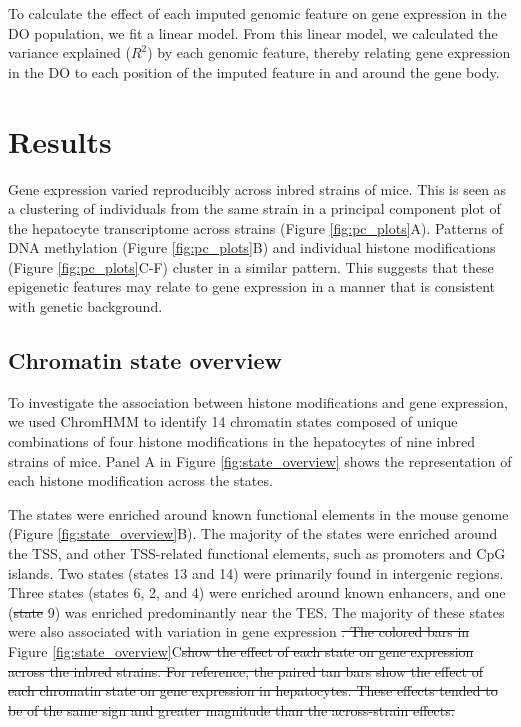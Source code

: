 \documentclass[10pt,letterpaper]{article}
\providecommand{\DIFaddtex}[1]{{\protect\color{blue}\uwave{#1}}} %
\providecommand{\DIFdeltex}[1]{{\protect\color{red}\sout{#1}}}                      %
\providecommand{\DIFaddbegin}{} %
\providecommand{\DIFaddend}{} %
\providecommand{\DIFdelbegin}{} %
\providecommand{\DIFdelend}{} %
\providecommand{\DIFadd}[1]{\texorpdfstring{\DIFaddtex{#1}}{#1}} %
\providecommand{\DIFdel}[1]{\texorpdfstring{\DIFdeltex{#1}}{}} %
\newcommand{\DIFscaledelfig}{0.5}
\newlength{\DIFdelgraphicswidth} %
\newlength{\DIFdelgraphicsheight} %
\newcommand{\DIFaddincludegraphics}[2][]{{\color{blue}\fbox{\DIFOincludegraphics[#1]{#2}}}} %
\newcommand{\DIFdelincludegraphics}[2][]{%
\sbox{\DIFdelgraphicsbox}{\DIFOincludegraphics[#1]{#2}}%
\settoboxwidth{\DIFdelgraphicswidth}{\DIFdelgraphicsbox} %
\settoboxtotalheight{\DIFdelgraphicsheight}{\DIFdelgraphicsbox} %
\scalebox{\DIFscaledelfig}{%
\parbox[b]{\DIFdelgraphicswidth}{\usebox{\DIFdelgraphicsbox}\\[-\baselineskip] \rule{\DIFdelgraphicswidth}{0em}}\llap{\resizebox{\DIFdelgraphicswidth}{\DIFdelgraphicsheight}{%
\setlength{\unitlength}{\DIFdelgraphicswidth}%
\begin{picture}(1,1)%
\thicklines\linethickness{2pt} %
{\color[rgb]{1,0,0}\put(0,0){\framebox(1,1){}}}%
{\color[rgb]{1,0,0}\put(0,0){\line( 1,1){1}}}%
{\color[rgb]{1,0,0}\put(0,1){\line(1,-1){1}}}%
\end{picture}%
}\hspace*{3pt}}} %
} %
\DeclareRobustCommand{\DIFaddbegin}{\DIFOaddbegin \let\includegraphics\DIFaddincludegraphics} %
\DeclareRobustCommand{\DIFaddend}{\DIFOaddend \let\includegraphics\DIFOincludegraphics} %
\DeclareRobustCommand{\DIFdelbegin}{\DIFOdelbegin \let\includegraphics\DIFdelincludegraphics} %
\DeclareRobustCommand{\DIFdelend}{\DIFOaddend \let\includegraphics\DIFOincludegraphics} %
\begin{document}
To calculate the effect of each imputed genomic feature on gene
expression in the DO population, we fit a linear model. From this linear
model, we calculated the variance explained (\(R^2\)) by each genomic
feature, thereby relating gene expression in the DO to each position of
the imputed feature in and around the gene body.

\hypertarget{results}{%
\section{Results}\label{results}}

Gene expression varied reproducibly across inbred strains of mice. This
is seen as a clustering of individuals from the same strain in a
principal component plot of the hepatocyte transcriptome across strains
(Figure \ref{fig:pc_plots}A). Patterns of DNA methylation (Figure
\ref{fig:pc_plots}B) and individual histone modifications (Figure
\ref{fig:pc_plots}C-F) cluster in a similar pattern. This suggests that
these epigenetic features may relate to gene expression in a manner that
is consistent with genetic background.

\hypertarget{chromatin-state-overview}{%
\subsection{Chromatin state overview}\label{chromatin-state-overview}}

To investigate the association between histone modifications and gene
expression, we used ChromHMM to identify 14 chromatin states composed of
unique combinations of four histone modifications in the hepatocytes of
nine inbred strains of mice. Panel A in Figure \ref{fig:state_overview}
shows the representation of each histone modification across the states.

The states were enriched around known functional elements in the mouse
genome (Figure \ref{fig:state_overview}B). The majority of the states
were enriched around the TSS, and other TSS-related functional elements,
such as promoters and CpG islands. Two states (states 13 and 14) were
primarily found in intergenic regions. Three states (states 6, 2, and 4)
were enriched around known enhancers, and one (\DIFdelbegin \DIFdel{state }\DIFdelend \DIFaddbegin \DIFadd{State }\DIFaddend 9) was enriched
predominantly near the TES. The majority of these states were also
associated with variation in gene expression \DIFdelbegin \DIFdel{. The colored bars in }\DIFdelend \DIFaddbegin \DIFadd{across strains (}\DIFaddend Figure
\ref{fig:state_overview}C\DIFdelbegin \DIFdel{show the effect of each state on gene
expression across the inbred strains.
For reference, the paired tan bars
show the effect of each chromatin state on gene expression in
hepatocytes. These effects tended to be of the same sign and greater
magnitude than the across-strain effects.
}\DIFdelend \DIFaddbegin \DIFadd{).
}\DIFaddend 
\end{document}
